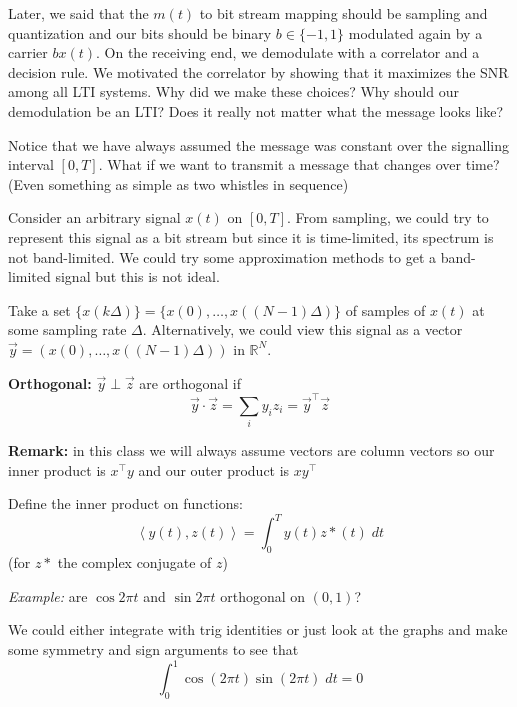 \documentclass[12pt]{report}
\newcommand{\R}{\mathbb{R}}
\newcommand{\brak}[1]{\left\langle #1 \right\rangle}
\newcommand*{\tbf}[1]{\ifmmode\mathbf{#1}\else\textbf{#1}\fi}
\begin{document}
Later, we said that the $m(t)$ to bit stream mapping should be sampling and quantization and our bits should be binary $b \in \{-1, 1\}$ modulated again by a carrier $b x(t)$. On the receiving end, we demodulate with a correlator and a decision rule. We motivated the correlator by showing that it maximizes the SNR among all LTI systems. Why did we make these choices? Why should our demodulation be an LTI? Does it really not matter what the message looks like? 

Notice that we have always assumed the message was constant over the signalling interval $[0, T]$. What if we want to transmit a message that changes over time? (Even something as simple as two whistles in sequence) 

Consider an arbitrary signal $x(t)$ on $[0, T]$. From sampling, we could try to represent this signal as a bit stream but since it is time-limited, its spectrum is not band-limited. We could try some approximation methods to get a band-limited signal but this is not ideal.

Take a set $\{x(k \Delta)\} = \{x(0), \dots, x((N-1)\Delta)\}$ of samples of $x(t)$ at some sampling rate $\Delta$. Alternatively, we could view this signal as a vector $\vec y = (x(0), \dots, x((N-1)\Delta))$ in $\R^N$.

\tbf{Orthogonal:} $\vec y \perp \vec z$ are orthogonal if 
\[\vec y \cdot \vec z = \sum_i y_i z_i = \vec y^{\top} \vec z\]

\tbf{Remark:} in this class we will always assume vectors are column vectors so our inner product is $x^\top y$ and our outer product is $xy^\top $

Define the inner product on functions: 
\[\brak{ y(t), z(t)} = \int_0^T y(t) z*(t)\; dt\]
(for $z*$ the complex conjugate of $z$)

\emph{Example:} are $\cos 2 \pi t$ and $\sin 2\pi t$ orthogonal on $(0,1)$?

We could either integrate with trig identities or just look at the graphs and make some symmetry and sign arguments to see that 
\[\int_0^1 \cos (2 \pi t) \sin (2\pi t) \; dt = 0\]
    
\end{document}
